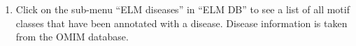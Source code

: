 \begin{enumerate}
\item Click on the sub-menu ``ELM diseases'' in ``ELM DB'' to see a list of all
	motif classes that have been annotated with a disease.  Disease
	information is taken from the OMIM database.  


\end{enumerate}

